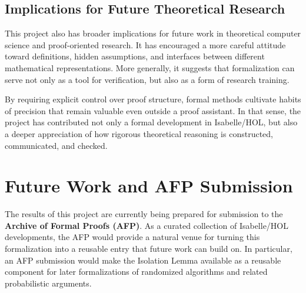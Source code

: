\subsection{Implications for Future Theoretical Research}

This project also has broader implications for future work in theoretical computer science and proof-oriented research.
It has encouraged a more careful attitude toward definitions, hidden assumptions, and interfaces between different mathematical representations.
More generally, it suggests that formalization can serve not only as a tool for verification, but also as a form of research training.

By requiring explicit control over proof structure, formal methods cultivate habits of precision that remain valuable even outside a proof assistant.
In that sense, the project has contributed not only a formal development in Isabelle/HOL, but also a deeper appreciation of how rigorous theoretical reasoning is constructed, communicated, and checked.


\section{Future Work and AFP Submission}
The results of this project are currently being prepared for submission to the \textbf{Archive of Formal Proofs (AFP)}.
As a curated collection of Isabelle/HOL developments, the AFP would provide a natural venue for turning this formalization into a reusable entry that future work can build on.
In particular, an AFP submission would make the Isolation Lemma available as a reusable component for later formalizations of randomized algorithms and related probabilistic arguments.

